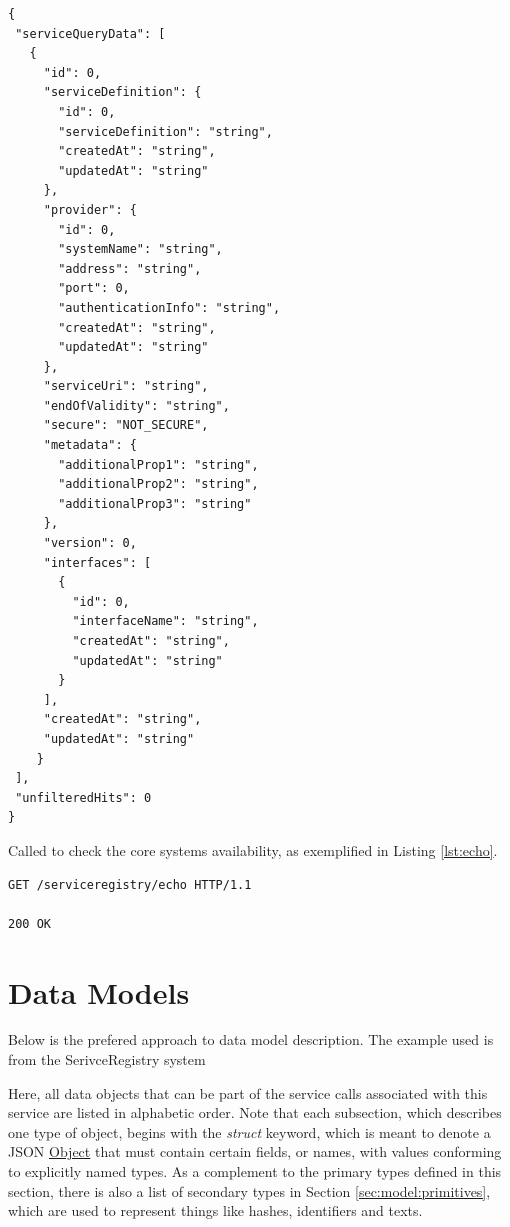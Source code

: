 \documentclass[a4paper]{arrowhead}
\newcommand{\fref}[1]{{\textcolor{ArrowheadBlue}{\hyperref[sec:functions:#1]{#1}}}}
\newcommand{\pref}[1]{{\textcolor{ArrowheadGrey}{\hyperref[sec:model:primitives:#1]{#1}}}}
\begin{document}
\begin{lstlisting}[language=http,label={lst:query_response},caption={A \fref{Query} response. Every \pref{Object} contains an id.}]
{
 "serviceQueryData": [
   {
     "id": 0,
     "serviceDefinition": {
       "id": 0,
       "serviceDefinition": "string",
       "createdAt": "string",
       "updatedAt": "string"
     },
     "provider": {
       "id": 0,
       "systemName": "string",
       "address": "string",
       "port": 0,
       "authenticationInfo": "string",
       "createdAt": "string",
       "updatedAt": "string"
     },
     "serviceUri": "string",
     "endOfValidity": "string",
     "secure": "NOT_SECURE",
     "metadata": {
       "additionalProp1": "string",
       "additionalProp2": "string",
       "additionalProp3": "string"
     },
     "version": 0,
     "interfaces": [
       {
         "id": 0,
         "interfaceName": "string",
         "createdAt": "string",
         "updatedAt": "string"
       }
     ],
     "createdAt": "string",
     "updatedAt": "string"
    }
 ],
 "unfilteredHits": 0
}
\end{lstlisting}


Called to check the core systems availability, as exemplified in Listing \ref{lst:echo}.

\begin{lstlisting}[language=http,label={lst:echo},caption={An \fref{Echo} invocation response.}]
GET /serviceregistry/echo HTTP/1.1

200 OK

\end{lstlisting}
\color{black}


\newpage

\section{Data Models}
\label{sec:model}

\color{red}
Below is the prefered approach to data model description.
The example used is from the SerivceRegistry system

Here, all data objects that can be part of the service calls associated with this service are listed in alphabetic order.
Note that each subsection, which describes one type of object, begins with the \textit{struct} keyword, which is meant to denote a JSON \pref{Object} that must contain certain fields, or names, with values conforming to explicitly named types.
As a complement to the primary types defined in this section, there is also a list of secondary types in Section \ref{sec:model:primitives}, which are used to represent things like hashes, identifiers and texts.
\end{document}
